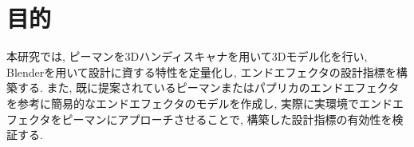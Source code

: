 \section{目的}
本研究では, ピーマンを3Dハンディスキャナを用いて3Dモデル化を行い, Blenderを用いて設計に資する特性を定量化し, エンドエフェクタの設計指標を構築する.
また, 既に提案されているピーマンまたはパプリカのエンドエフェクタを参考に簡易的なエンドエフェクタのモデルを作成し, 実際に実環境でエンドエフェクタをピーマンにアプローチさせることで, 構築した設計指標の有効性を検証する.
